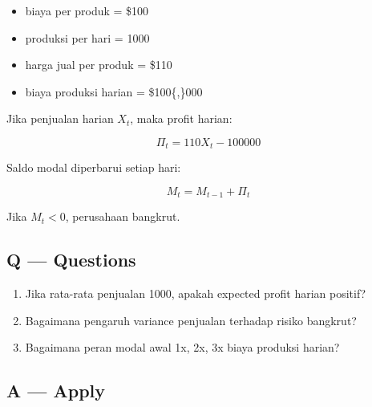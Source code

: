 \documentclass[
  letterpaper,
  DIV=11,
  numbers=noendperiod]{scrreprt}
\providecommand{\tightlist}{%
  \setlength{\itemsep}{0pt}\setlength{\parskip}{0pt}}
\begin{document}
\begin{itemize}
\tightlist
\item
  biaya per produk = \$100
\item
  produksi per hari = 1000
\item
  harga jual per produk = \$110
\item
  biaya produksi harian = \$100\{,\}000
\end{itemize}

Jika penjualan harian \(X_t\), maka profit harian:

\[
\Pi_t = 110X_t - 100000
\]

Saldo modal diperbarui setiap hari:

\[
M_t = M_{t-1} + \Pi_t
\]

Jika \(M_t < 0\), perusahaan bangkrut.

\subsection{Q --- Questions}\label{q-questions-5}

\begin{enumerate}
\def\labelenumi{\arabic{enumi}.}
\tightlist
\item
  Jika rata-rata penjualan 1000, apakah expected profit harian positif?
\item
  Bagaimana pengaruh variance penjualan terhadap risiko bangkrut?
\item
  Bagaimana peran modal awal 1x, 2x, 3x biaya produksi harian?
\end{enumerate}

\subsection{A --- Apply}\label{a-apply-5}
\end{document}
